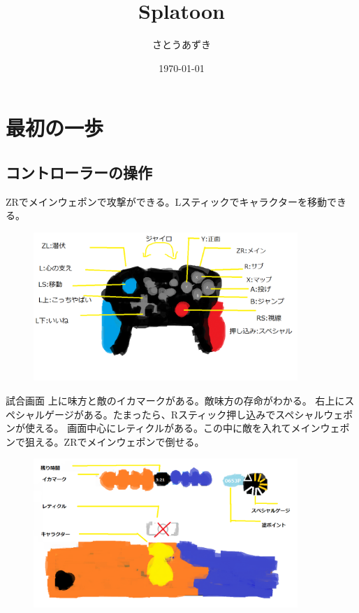 \documentclass[a4paper,11pt]{jsbook}
\begin{document}
\title{Splatoon}
\author{さとうあずき}
\date{\today}
\maketitle
\tableofcontents


\chapter{最初の一歩}
\section{コントローラーの操作}
ZRでメインウェポンで攻撃ができる。Lスティックでキャラクターを移動できる。
\begin{figure}[h]
  \begin{center}
    \includegraphics[width=10cm]{resoource/Controller_button.png}
  \end{center}
\end{figure}

試合画面
上に味方と敵のイカマークがある。敵味方の存命がわかる。
右上にスペシャルゲージがある。たまったら、Rスティック押し込みでスペシャルウェポンが使える。
画面中心にレティクルがある。この中に敵を入れてメインウェポンで狙える。ZRでメインウェポンで倒せる。
\begin{figure}[h]
  \begin{center}
    \includegraphics[width=10cm]{resoource/gamescreenframe.png}
  \end{center}
\end{figure}
\end{document}
